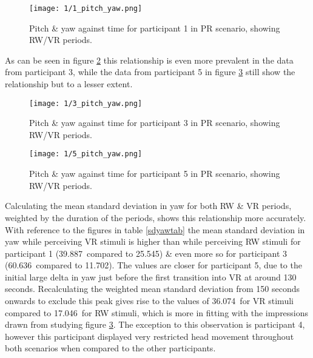 \begin{figure}[h]
	\begin{center}
	\texttt{[image: 1/1\_pitch\_yaw.png]}
	\caption{Pitch \& yaw against time for participant 1 in PR scenario, showing RW/VR periods.}
	\label{1_pitch_yaw.png}
	\end{center}
\end{figure}

As can be seen in figure \ref{3_pitch_yaw.png} this relationship is even more prevalent in the data from participant 3, while the data from participant 5 in figure \ref{5_pitch_yaw.png} still show the relationship but to a lesser extent.

\begin{figure}[h]
	\begin{center}
	\texttt{[image: 1/3\_pitch\_yaw.png]}
	\caption{Pitch \& yaw against time for participant 3 in PR scenario, showing RW/VR periods.}
	\label{3_pitch_yaw.png}
	\end{center}
\end{figure}

\begin{figure}[h]
	\begin{center}
	\texttt{[image: 1/5\_pitch\_yaw.png]}
	\caption{Pitch \& yaw against time for participant 5 in PR scenario, showing RW/VR periods.}
	\label{5_pitch_yaw.png}
	\end{center}
\end{figure}

Calculating the mean standard deviation in yaw for both RW \& VR periods, weighted by the duration of the periods, shows this relationship more accurately. With reference to the figures in table \ref{sdyawtab} the mean standard deviation in yaw while perceiving VR stimuli is higher than while perceiving RW stimuli for participant 1 (39.887\textdegree\ compared to 25.545\textdegree) \& even more so for participant 3 (60.636\textdegree\ compared to 11.702\textdegree). The values are closer for participant 5, due to the initial large delta in yaw just before the first transition into VR at around 130 seconds. Recalculating the weighted mean standard deviation from 150 seconds onwards to exclude this peak gives rise to the values of 36.074\textdegree\ for VR stimuli compared to 17.046\textdegree\ for RW stimuli, which is more in fitting with the impressions drawn from studying figure \ref{5_pitch_yaw.png}. The exception to this observation is participant 4, however this participant displayed very restricted head movement throughout both scenarios when compared to the other participants.

